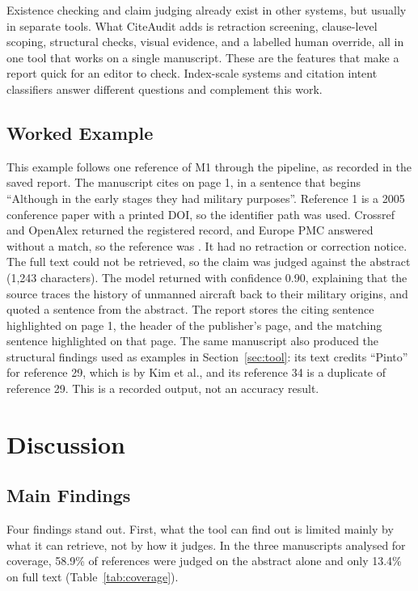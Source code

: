 \documentclass{article}
\newcommand{\vd}[1]{\texttt{\detokenize{#1}}}
\begin{document}
Existence checking and claim judging already exist in other systems, but usually in separate tools. What CiteAudit adds is retraction screening, clause-level scoping, structural checks, visual evidence, and a labelled human override, all in one tool that works on a single manuscript. These are the features that make a report quick for an editor to check. Index-scale systems \cite{nicholson2021,peroni2020} and citation intent classifiers \cite{cohan2019,jurgens2018} answer different questions and complement this work.

\subsection{Worked Example}

This example follows one reference of M1 through the pipeline, as recorded in the saved report. The manuscript cites \vd{[1, 2]} on page 1, in a sentence that begins ``Although in the early stages they had military purposes''. Reference 1 is a 2005 conference paper with a printed DOI, so the identifier path was used. Crossref and OpenAlex returned the registered record, and Europe PMC answered without a match, so the reference was \vd{confirmed}. It had no retraction or correction notice. The full text could not be retrieved, so the claim was judged against the abstract (1{,}243 characters). The model returned \vd{supported} with confidence 0.90, explaining that the source traces the history of unmanned aircraft back to their military origins, and quoted a sentence from the abstract. The report stores the citing sentence highlighted on page 1, the header of the publisher's page, and the matching sentence highlighted on that page. The same manuscript also produced the structural findings used as examples in Section~\ref{sec:tool}: its text credits ``Pinto'' for reference 29, which is by Kim et al., and its reference 34 is a duplicate of reference 29. This is a recorded output, not an accuracy result.

\section{Discussion}
\label{sec:discussion}

\subsection{Main Findings}

Four findings stand out. First, what the tool can find out is limited mainly by what it can retrieve, not by how it judges. In the three manuscripts analysed for coverage, 58.9\% of references were judged on the abstract alone and only 13.4\% on full text (Table~\ref{tab:coverage}).
\end{document}

